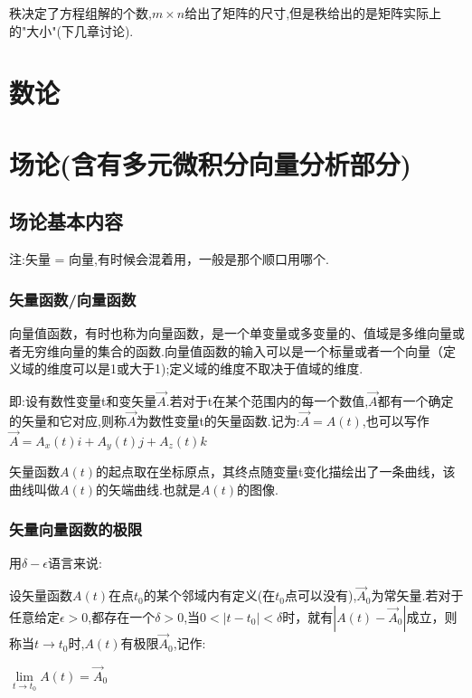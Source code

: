 \documentclass[UTF8,12pt]{ctexbook}
\newcommand{\limNormal}[1]{\lim\limits_{#1}}
\begin{document}
{{{{{  秩决定了方程组解的个数,$m \times n$给出了矩阵的尺寸,但是秩给出的是矩阵实际上的"大小"(下几章讨论).
}%

}%

}%

\section{数论}{

 }%

\section{场论(含有多元微积分向量分析部分)}{

  \subsection{场论基本内容}{
    注:矢量 = 向量,有时候会混着用，一般是那个顺口用哪个.

    \subsubsection{矢量函数/向量函数}{
      向量值函数，有时也称为向量函数，是一个单变量或多变量的、值域是多维向量或者无穷维向量的集合的函数.向量值函数的输入可以是一个标量或者一个向量（定义域的维度可以是1或大于1);定义域的维度不取决于值域的维度.

      即:设有数性变量t和变矢量$\vec{A}$.若对于t在某个范围内的每一个数值,$\vec{A}$都有一个确定的矢量和它对应,则称$\vec{A}$为数性变量t的矢量函数.记为:$\vec{A} = A(t)$,也可以写作$\vec{A} = A_x(t)i + A_y(t)j + A_z(t)k$

      矢量函数$A(t)$的起点取在坐标原点，其终点随变量t变化描绘出了一条曲线，该曲线叫做$A(t)$的矢端曲线.也就是$A(t)$的图像.
    }%

    \subsubsection{矢量向量函数的极限}{
      用$\delta-\epsilon$语言来说:

      设矢量函数$A(t)$在点$t_0$的某个邻域内有定义(在$t_0$点可以没有),$\vec{A}_0$为常矢量.若对于任意给定$\epsilon > 0$,都存在一个$\delta > 0$,当$0 < |t - t_0| < \delta$时，就有$|A(t) - \vec{A}_0|$成立，则称当$t \to t_0$时,$A(t)$有极限$\vec{A}_0$,记作:

      \begin{center}
        $\limNormal{t \to t_0}A(t) = \vec{A}_0$
      \end{center}

}}}}}
\end{document}

